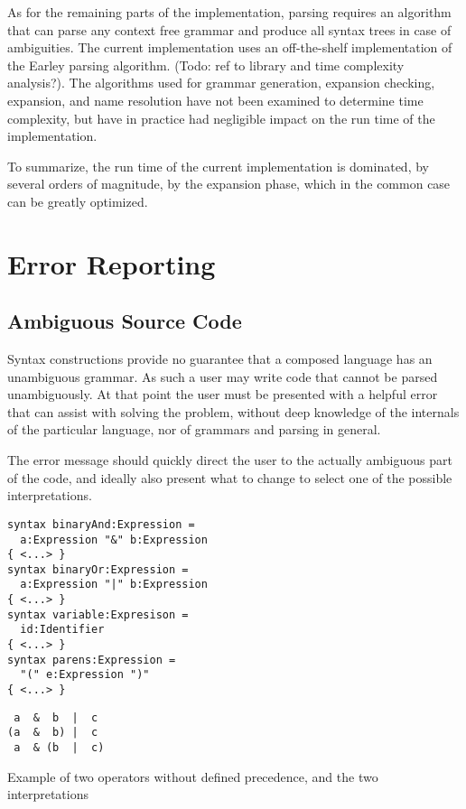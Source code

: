 \documentclass{kththesis}
\begin{document}
As for the remaining parts of the implementation, parsing requires an algorithm that can parse any context free grammar and produce all syntax trees in case of ambiguities. The current implementation uses an off-the-shelf implementation of the Earley parsing algorithm. (Todo: ref to library and time complexity analysis?). The algorithms used for grammar generation, expansion checking, expansion, and name resolution have not been examined to determine time complexity, but have in practice had negligible impact on the run time of the implementation.

To summarize, the run time of the current implementation is dominated, by several orders of magnitude, by the expansion phase, which in the common case can be greatly optimized.

\section{Error Reporting}

\subsection{Ambiguous Source Code} \label{sec:errors-ambiguous}

Syntax constructions provide no guarantee that a composed language has an unambiguous grammar. As such a user may write code that cannot be parsed unambiguously. At that point the user must be presented with a helpful error that can assist with solving the problem, without deep knowledge of the internals of the particular language, nor of grammars and parsing in general.

The error message should quickly direct the user to the actually ambiguous part of the code, and ideally also present what to change to select one of the possible interpretations.

\begin{listing}[h]
\begin{verbatim}
syntax binaryAnd:Expression =
  a:Expression "&" b:Expression
{ <...> }
syntax binaryOr:Expression =
  a:Expression "|" b:Expression
{ <...> }
syntax variable:Expresison =
  id:Identifier
{ <...> }
syntax parens:Expression =
  "(" e:Expression ")"
{ <...> }
\end{verbatim}
\begin{verbatim}
 a  &  b  |  c
(a  &  b) |  c
 a  & (b  |  c)
\end{verbatim}
\caption{Example of two operators without defined precedence, and the two interpretations}
\label{lst:undefined-precedence-operators}
\end{listing}
\end{document}
